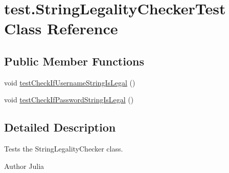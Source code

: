 \hypertarget{classtest_1_1_string_legality_checker_test}{
\section{test.\-String\-Legality\-Checker\-Test \-Class \-Reference}
\label{classtest_1_1_string_legality_checker_test}
}
\subsection*{\-Public \-Member \-Functions}
\begin{DoxyCompactItemize}
\item 
void \hyperlink{classtest_1_1_string_legality_checker_test_a25e2c742dcc8d5a191d18a1d2537993c}{test\-Check\-If\-Username\-String\-Is\-Legal} ()
\item 
void \hyperlink{classtest_1_1_string_legality_checker_test_a65d73b2d4f5ebb18dafd54b9577a9459}{test\-Check\-If\-Password\-String\-Is\-Legal} ()
\end{DoxyCompactItemize}


\subsection{\-Detailed \-Description}
\-Tests the \-String\-Legality\-Checker class. \begin{DoxyAuthor}{\-Author}
\-Julia 
\end{DoxyAuthor}


